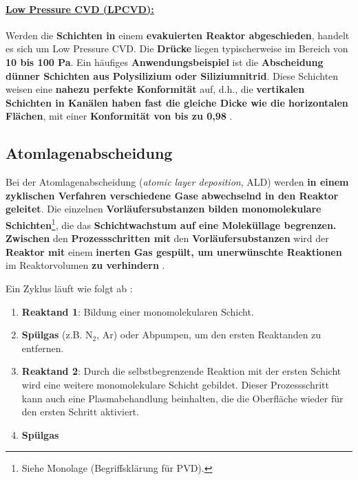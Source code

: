 \documentclass{article} %
\begin{document}
\vspace{0.0em}

\paragraph{\uline{Low Pressure CVD (LPCVD):}} Werden die \textbf{Schichten in} einem \textbf{evakuierten Reaktor abgeschieden}, handelt es sich um Low Pressure CVD. Die \textbf{Drücke} liegen typischerweise im Bereich von \textbf{10 bis 100 Pa}. Ein häufiges \textbf{Anwendungsbeispiel} ist die \textbf{Abscheidung dünner Schichten aus Polysilizium oder Siliziumnitrid}. Diese Schichten weisen eine \textbf{nahezu perfekte Konformität} auf, d.h., die \textbf{vertikalen Schichten in Kanälen haben fast die gleiche Dicke wie die horizontalen Flächen}, mit einer \textbf{Konformität von bis zu 0,98} \cite{keplinger2024CVD}.





\vspace{1em}

\subsection{Atomlagenabscheidung} %

Bei der Atomlagenabscheidung (\textit{atomic layer deposition}, ALD) werden \textbf{in einem zyklischen Verfahren verschiedene Gase abwechselnd in den Reaktor geleitet}. Die einzelnen \textbf{Vorläufersubstanzen bilden monomolekulare Schichten}\footnote{Siehe Monolage (Begriffsklärung für PVD).}, die das \textbf{Schichtwachstum auf eine Moleküllage begrenzen. Zwischen} den \textbf{Prozessschritten mit} den \textbf{Vorläufersubstanzen} wird der \textbf{Reaktor mit} einem \textbf{inerten Gas gespült, um unerwünschte Reaktionen} im Reaktorvolumen \textbf{zu verhindern} \cite{keplinger2024CVD}.

\vspace{1em}

Ein Zyklus läuft wie folgt ab \cite{keplinger2024CVD}:

\begin{enumerate}
    \item \textbf{Reaktand 1}: Bildung einer monomolekularen Schicht.
    \item \textbf{Spülgas} (z.B. N$_2$, Ar) oder Abpumpen, um den ersten Reaktanden zu entfernen.
    \item \textbf{Reaktand 2}: Durch die selbstbegrenzende Reaktion mit der ersten Schicht wird eine weitere monomolekulare Schicht gebildet. Dieser Prozessschritt kann auch eine Plasmabehandlung beinhalten, die die Oberfläche wieder für den ersten Schritt aktiviert.
    \item \textbf{Spülgas}
\end{enumerate}
\end{document}
